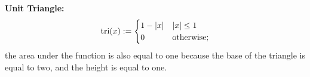 \textbf{Unit Triangle:}
\begin{equation}
    \label{eq:UnitTriangle}
    {\rm tri}(x):= \begin{cases} 1 - |x| & |x| \le 1\\
    0 & \text{otherwise};       
    \end{cases}
\end{equation}
the area under the function is also equal to one because the base of the triangle is equal to two, and the height is equal to one.

\begin{figure}[htb!]%
\centering
{}%
\hspace{5pt}%
%
\newline
{}%
\hspace{5pt}%
%

\end{figure}
